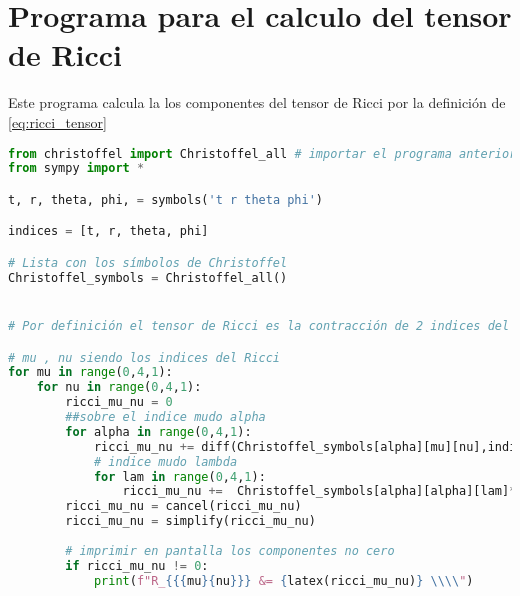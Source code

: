 \chapter{Programa para el calculo del tensor de Ricci}
\label{chap:programa_ricci}
Este programa calcula la los componentes del tensor de Ricci por la definición de \ref{eq:ricci_tensor}

\begin{lstlisting}[language=Python, caption=Programa para el calculo del tensor de Ricci]
from christoffel import Christoffel_all # importar el programa anterior
from sympy import *

t, r, theta, phi, = symbols('t r theta phi') 

indices = [t, r, theta, phi]

# Lista con los símbolos de Christoffel
Christoffel_symbols = Christoffel_all()


# Por definición el tensor de Ricci es la contracción de 2 indices del tensor de Riemann

# mu , nu siendo los indices del Ricci
for mu in range(0,4,1):
    for nu in range(0,4,1):
        ricci_mu_nu = 0
        ##sobre el indice mudo alpha
        for alpha in range(0,4,1):
            ricci_mu_nu += diff(Christoffel_symbols[alpha][mu][nu],indices[alpha]) -diff(Christoffel_symbols[alpha][mu][alpha],indices[nu]) 
            # indice mudo lambda
            for lam in range(0,4,1):
                ricci_mu_nu +=  Christoffel_symbols[alpha][alpha][lam]*Christoffel_symbols[lam][mu][nu] - Christoffel_symbols[alpha][nu][lam]*Christoffel_symbols[lam][mu][alpha]
        ricci_mu_nu = cancel(ricci_mu_nu)
        ricci_mu_nu = simplify(ricci_mu_nu)
 
        # imprimir en pantalla los componentes no cero
        if ricci_mu_nu != 0:
            print(f"R_{{{mu}{nu}}} &= {latex(ricci_mu_nu)} \\\\")
\end{lstlisting}


